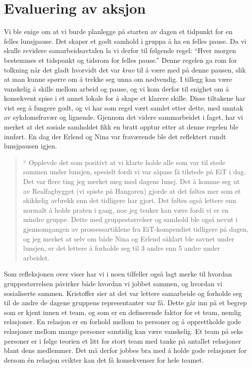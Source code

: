 
\section{Evaluering av aksjon} 

Vi ble enige om at vi burde planlegge på starten av dagen et tidpunkt for en felles lunsjpause. Det skaper et godt samhold i gruppa å ha en felles pause.  Da vi skulle revidere samarbeidsavtalen la vi derfor til følgende regel:  ``Hver morgen bestemmes et tidspunkt og tidsrom for felles pause.'' Denne regelen ga rom for tolkning når det gladt hvorvidt det var \emph{krav} til å være med på denne pausen, slik at man kunne spørre om å trekke seg unna om nødvendig. I tillegg kan være vanskelig å skille mellom arbeid og pause, og vi kom derfor til enighet om å konsekvent spise i et annet lokale for å skape et klarere skille. Disse tiltakene har vist seg å fungere godt, og vi har som regel vært samlet etter dette, med unntak av sykdomsfravær og lignende. Gjennom det videre sammarbeidet i faget, har vi merket at det sosiale samholdet fikk en bratt opptur etter at denne regelen ble innført. En dag der Erlend og Nina var fraværende ble det reflektert rundt lunsjpausen igjen.

\begin{quote}``
Opplevde det som positivt at vi klarte holde alle som var til stede sammen under lunsjen, spesielt fordi vi var såpass få tilstede på EiT i dag. Det var flere ting jeg merket meg med dagens lunsj. Det å komme seg ut av Realfagbygget (vi spiste på Hangaren) gjorde at det føltes mer som et skikkelig avbrekk enn det tidligere har gjort. Det føltes også lettere enn normalt å holde praten i gang, noe jeg tenker kan være fordi vi er en mindre gruppe. Dette med gruppestørrelser og samhold ble også nevnt i gjennomgangen av prossessartiklene fra EiT-kompendiet tidligere på dagen, og jeg merket at selv om både Nina og Erlend såklart ble savnet under lunsjen, er det lettere å forholde seg til 3 andre enn 5 andre under arbeidet.
\end{quote} 

Som refleksjonen over viser har vi i noen tilfeller også lagt merke til hvordan gruppestørrelsen påvirker både hvordan vi jobbet sammen, og hvordan vi sosialiserte sammen. Kristoffer sier at det var lettere samarbeide og forholde seg til de andre de dagene gruppens representanter var få. Dette går inn på et begrep som er kjent innen et team, og som er en definerende faktor for et team, nemlig relasjoner. 
En relasjon er en forhold mellom to personer og å opprettholde gode relasjoner mellom mange personer samtidig
kan være vanskelig. Et team på seks personer er i følge teorien  \cite{Artikkel4} et litt for stort team med tanke på antallet relasjoner
blant dens medlemmer. Det må derfor jobbes bra med å holde gode relasjoner for dersom én relasjon svikter kan det få 
konsekvenser for hele teamet. 

